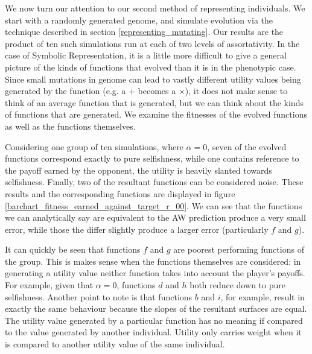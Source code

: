 \documentclass[11pt]{book}
\newcommand*{\np}{\par\noindent\newline}
\begin{document}
We now turn our attention to our second method of representing individuals.
We start with a randomly generated genome, and simulate evolution via the technique described in section \ref{representing_mutating}.
Our results are the product of ten such simulations run at each of two levels of assortativity.
In the case of Symbolic Representation, it is a little more difficult to give a general picture of the kinds of functions that evolved than it is in the phenotypic case.
Since small mutations in genome can lead to vastly different utility values being generated by the function (e.g. a $+$ becomes a $\times$), it does not make sense to think of an average function that is generated,
but we can think about the kinds of functions that are generated.
We examine the fitnesses of the evolved functions as well as the functions themselves.

\np Considering one group of ten simulations, where $\alpha = 0$, seven of the evolved functions correspond exactly to pure selfishness,
while one contains reference to the payoff earned by the opponent, the utility is heavily slanted towards selfishness.
Finally, two of the resultant functions can be considered noise.
These results and the corresponding functions are displayed in figure \ref{barchart_fitness_earned_against_target_r_00}.
We can see that the functions we can analytically say are equivalent to the AW prediction produce a very small error, while those the differ slightly produce a larger error (particularly $f$ and $g$).

\np It can quickly be seen that functions $f$ and $g$ are poorest performing functions of the group.
This is makes sense when the functions themselves are considered: in generating a utility value neither function takes into account the player's payoffs.
For example, given that $\alpha=0$, functions $d$ and $h$ both reduce down to pure selfishness.
Another point to note is that functions $b$ and $i$, for example, result in exactly the same behaviour because the slopes of the resultant surfaces are equal.
The utility value generated by a particular function has no meaning if compared to the value generated by another individual.
Utility only carries weight when it is compared to another utility value of the same individual. 
\end{document}

